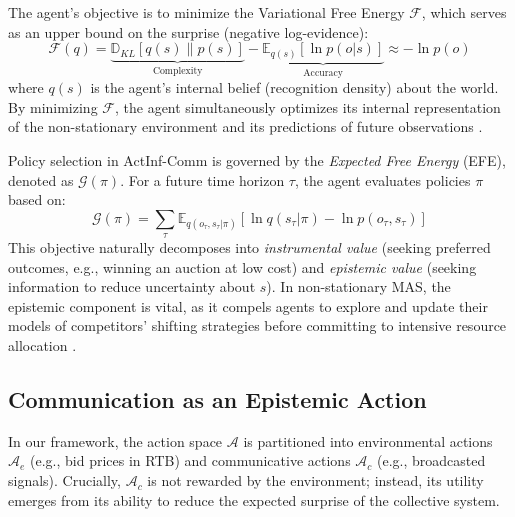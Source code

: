 The agent's objective is to minimize the Variational Free Energy $\mathcal{F}$, which serves as an upper bound on the surprise (negative log-evidence):
\begin{equation}
    \mathcal{F}(q) = \underbrace{\mathbb{D}_{KL}[q(s) \parallel p(s)]}_{\text{Complexity}} - \underbrace{\mathbb{E}_{q(s)}[\ln p(o|s)]}_{\text{Accuracy}} \approx -\ln p(o)
\label{eq:vfe}
\end{equation}
where $q(s)$ is the agent's internal belief (recognition density) about the world. By minimizing $\mathcal{F}$, the agent simultaneously optimizes its internal representation of the non-stationary environment and its predictions of future observations \cite{parr2022active}. 

Policy selection in ActInf-Comm is governed by the \textit{Expected Free Energy} (EFE), denoted as $\mathcal{G}(\pi)$. For a future time horizon $\tau$, the agent evaluates policies $\pi$ based on:
\begin{equation}
    \mathcal{G}(\pi) = \sum_{\tau} \mathbb{E}_{q(o_\tau, s_\tau | \pi)} [\ln q(s_\tau | \pi) - \ln p(o_\tau, s_\tau)]
\label{eq:efe}
\end{equation}
This objective naturally decomposes into \textit{instrumental value} (seeking preferred outcomes, e.g., winning an auction at low cost) and \textit{epistemic value} (seeking information to reduce uncertainty about $s$). In non-stationary MAS, the epistemic component is vital, as it compels agents to explore and update their models of competitors' shifting strategies before committing to intensive resource allocation \cite{da2020active}.

\subsection{Communication as an Epistemic Action}
\label{sec:comm_action}

In our framework, the action space $\mathcal{A}$ is partitioned into environmental actions $\mathcal{A}_e$ (e.g., bid prices in RTB) and communicative actions $\mathcal{A}_c$ (e.g., broadcasted signals). Crucially, $\mathcal{A}_c$ is not rewarded by the environment; instead, its utility emerges from its ability to reduce the expected surprise of the collective system.

